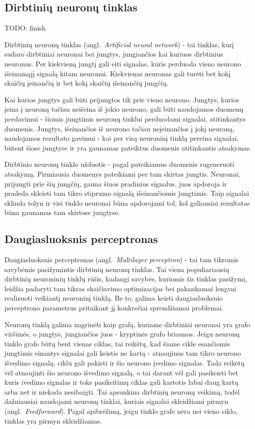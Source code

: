 \documentclass{VUMIFPSbakalaurinis}
\newcommand{\TODO}[1]{
\colorbox{todo-background-color}{TODO: #1}
}
\begin{document}
\subsection{Dirbtinių neuronų tinklas}

\TODO{finish}

Dirbtinių neuronų tinklas (angl.~\textit{Artificial neural network}) - tai tinklas, kurį sudaro dirbtiniai neuronai bei jungtys, jungiančios kai kuriuos dirbtinius neuronus.
Per kiekvieną jungtį gali eiti signalas, kuris perduoda vieno neurono išeinamąjį signalą kitam neuronui.
Kiekvienas neuronas gali turėti bet kokį skaičių įeinančių ir bet kokį skaičių išeinančių jungčių.

Kai kurios jungtys gali būti prijungtos tik prie vieno neurono.
Jungtys, kurios įeina į neuroną tačiau neišeina iš jokio neurono, gali būti naudojamos duomenų perdavimui - šiomis jungtimis neuronų tinklui perduodami signalai, atitinkantys duomenis.
Jungtys, išeinančios iš neurono tačiau neįeinančios į jokį neuroną, naudojamos rezultato gavimui - kai per visą neuroninį tinklą pereina signalai, būtent šiose jungtyse ir yra gaunamas pateiktus duomenis atitinkantis atsakymas.

Dirbtinio neuronų tinklo užduotis - pagal pateikiamus duomenis sugeneruoti atsakymą.
Pirmiausia duomenys pateikiami per tam skirtas jungtis.
Neuronai, prijungti prie šių jungčių, gauna šiuos pradinius signalus, juos apdoroja ir pradeda skleisti tam tikro stiprumo signalą išeinančiomis jungtimis.
Taip signalai sklinda tolyn ir visi tinklo neuronai būna apdorojami tol, kol galiausiai rezultatas būna gaunamas tam skirtose jungtyse.



\subsection{Daugiasluoksnis perceptronas}

Daugiasluoksnis perceptronas (angl.~\textit{Multilayer perceptron}) - tai tam tikromis savybėmis pasižymintis dirbtinių neuronų tinklas.
Tai viena populiariausių dirbtinių neuroninių tinklų rūšis, kadangi savybės, kuriomis šis tinklas pasižymi, leidžia padaryti tam tikras skaičiavimo optimizacijas bei pakankamai lengvai realizuoti veikiantį neuroninį tinklą.
Be to, galima keisti daugiasluoksnio perceptrono parametrus pritaikant jį konkrečiai sprendžiamai problemai.

Neuronų tinklą galima nagrinėti kaip grafą, kuriame dirbtiniai neuronai yra grafo viršūnės, o jungtys, jungiančios juos - kryptinės grafo briaunos.
Jeigu neuronų tinklo grafe būtų bent vienas ciklas, tai reikštų, kad šiame cikle esančiomis jungtimis einantys signalai gali keistis ne kartą - atnaujinus tam tikro neurono išvedimo signalą, ciklu gali pakisti ir šio neurono įvedimo signalas.
Tada reikėtų vėl atnaujinti šio neurono išvedimo signalą, o tai darant vėl gali pasikeisti bet kuris ivedimo signalas ir toks pasikeitimų ciklas gali kartotis labai daug kartų arba net ir niekada nesibaigti.
Tai apsunkina dirbtinių neuronų veikimą, todėl dažniausiai naudojami neuronų tinklai, kuriais signalai skleidžiami pirmyn (angl.~\textit{Feedforward}).
Pagal apibrėžimą, jeigu tinklo grafe nėra nei vieno ciklo, tinklas yra pirmyn skleidžiamas.
\end{document}
